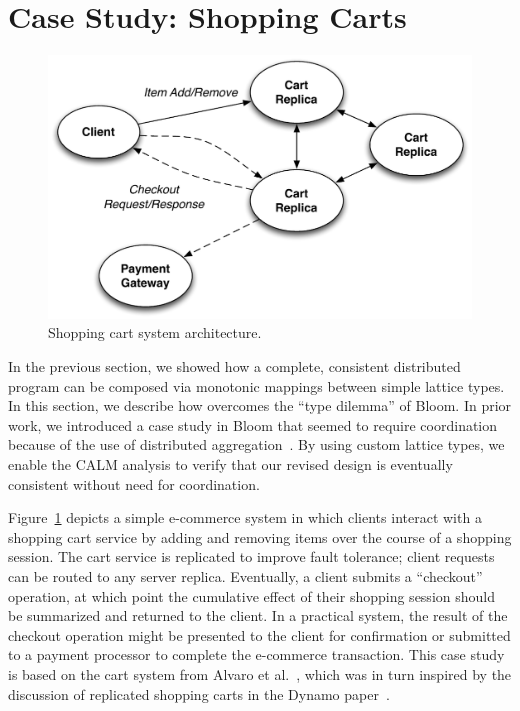 \section{Case Study: Shopping Carts}
\label{sec:carts}

\begin{figure}[t]
\centering
\includegraphics[width=\linewidth]{fig/cart_arch.pdf}
\caption{Shopping cart system architecture.}
\label{fig:cart-system-arch}
\end{figure}

In the previous section, we showed how a complete, consistent distributed
program can be composed via monotonic mappings between simple lattice types. In
this section, we describe how \lang overcomes the ``type dilemma'' of Bloom. In
prior work, we introduced a case study in Bloom that seemed to require
coordination because of the use of distributed aggregation~\cite{Alvaro2011}. By
using custom lattice types, we enable the \lang CALM analysis to verify that our
revised design is eventually consistent without need for coordination.

Figure~\ref{fig:cart-system-arch} depicts a simple e-commerce system in which
clients interact with a shopping cart service by adding and removing items over
the course of a shopping session. The cart service is replicated to improve
fault tolerance; client requests can be routed to any server
replica. Eventually, a client submits a ``checkout'' operation, at which point
the cumulative effect of their shopping session should be summarized and
returned to the client. In a practical system, the result of the checkout
operation might be presented to the client for confirmation or submitted to a
payment processor to complete the e-commerce transaction. This case study is
based on the cart system from Alvaro et al.~\cite{Alvaro2011}, which was in turn
inspired by the discussion of replicated shopping carts in the Dynamo
paper~\cite{DeCandia2007}.

